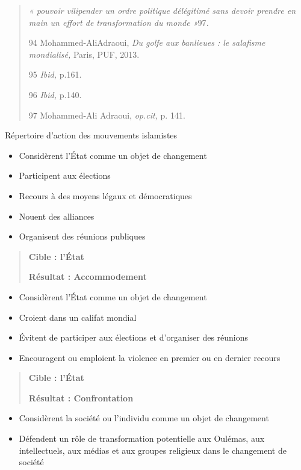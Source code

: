 \begin{quote}
\emph{« pouvoir vilipender un ordre politique délégitimé sans devoir
prendre en main un effort de transformation du monde »}97\emph{.}

94 Mohammed-AliAdraoui, \emph{Du golfe aux banlieues : le salafisme
mondialisé,} Paris, PUF, 2013.

95 \emph{Ibid,} p.161.

96 \emph{Ibid,} p.140.

97 Mohammed-Ali Adraoui, \emph{op.cit,} p. 141.


\end{quote}

Répertoire d'action des mouvements islamistes

\begin{itemize}
\item
  Considèrent l'État comme un objet de changement
\item
  Participent aux élections
\item
  Recours à des moyens légaux et démocratiques
\item
  Nouent des alliances
\item
  Organisent des réunions publiques
\end{itemize}

\begin{quote}
\textbf{Cible : l'État}

\textbf{Résultat : Accommodement}
\end{quote}

\begin{itemize}
\item
  Considèrent l'État comme un objet de changement
\item
  Croient dans un califat mondial
\item
  Évitent de participer aux élections et d'organiser des réunions
\item
  Encouragent ou emploient la violence en premier ou en dernier recours
\end{itemize}

\begin{quote}
\textbf{Cible : l'État}

\textbf{Résultat : Confrontation}
\end{quote}

\begin{itemize}
\item
  Considèrent la société ou l'individu comme un objet de changement
\item
  Défendent un rôle de transformation potentielle aux Oulémas, aux
  intellectuels, aux médias et aux groupes religieux dans le changement
  de société
\end{itemize}

